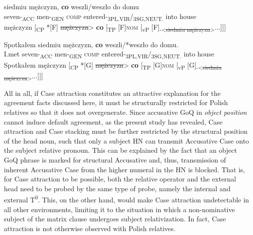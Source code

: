 \documentclass[output=paper]{langsci/langscibook}
\begin{document}
\ea%
    \label{ex:leska:33}
    \gll siedmiu   mężczyzn,   \textbf{co}   weszli/weszło     do   domu\\
         seven-\textsubscript{ACC}   men-\textsubscript{GEN}   \textsc{comp}   entered-\textsubscript{3PL,VIR}/\textsubscript{3SG,NEUT.} into   house \\
    \glt {} mężczyzn [\textsubscript{CP} *[F]\st{ mężczyzn}> \textbf{co} [\textsubscript{TP} [F]{\footnotesize\textsc{nom}} [\textsubscript{vP} [F]\textsubscript{-<\st{siedmiu mężczyzn}>}...]]]
\z

\ea%
    \label{ex:leska:34}
    \gll Spotkałem   siedmiu   mężczyzn,   \textbf{co}   weszli/*weszło do   domu.\\
         I.met     seven-\textsubscript{ACC}   men-\textsubscript{GEN}   \textsc{comp} entered-\textsubscript{3PL,VIR}/\textsubscript{3SG,NEUT.} into   house\\
    \glt Spotkałem  mężczyzn [\textsubscript{CP} *[G]\st{ mężczyzn}> \textbf{co} [\textsubscript{TP} [G]{\footnotesize\textsc{nom}} [\textsubscript{vP} [G]\textsubscript{-<\st{siedmiu mężczyzn}>}...]]]
\z


All in all, if Case attraction constitutes an attractive explanation for the agreement facts discussed here, it must be structurally restricted for Polish relatives so that it does not overgenerate. Since accusative GoQ in \textit{object position} cannot induce default agreement, as the present study has revealed, Case attraction and Case stacking must be further restricted by the structural position of the head noun, such that only a subject HN can transmit Accusative Case onto the subject relative pronoun. This can be explained by the fact that an object GoQ phrase is marked for structural Accusative and, thus, transmission of inherent Accusative Case from the higher numeral in the HN is blocked. That is, for Case attraction to be possible, both the relative operator and the external head need to be probed by the same type of probe, namely the internal and external T\textsuperscript{0}. This, on the other hand, would make Case attraction undetectable in all other environments, limiting it to the situation in which a non-nominative subject of the matrix clause undergoes subject relativization. In fact, Case attraction is not otherwise observed with Polish relatives. 
\end{document}
